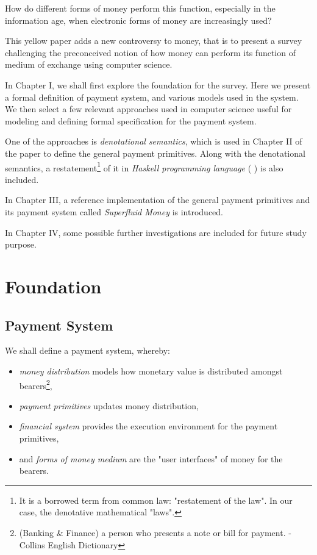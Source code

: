 \documentclass[a4paper]{report}
\begin{document}
How do different forms of money perform this function, especially in the information age, when electronic forms of money
are increasingly used?

This yellow paper adds a new controversy to money, that is to present a survey challenging the preconceived notion of
how money can perform its function of medium of exchange using computer science.

In Chapter I, we shall first explore the foundation for the survey. Here we present a formal definition of payment system,
and various models used in the system. We then select a few relevant approaches used in computer science useful for
modeling and defining formal specification for the payment system.

One of the approaches is \textit{denotational semantics}, which is used in Chapter II of the paper to define the general
payment primitives. Along with the denotational semantics, a restatement\footnote{It is a borrowed term from common law:
"restatement of the law". In our case, the denotative mathematical "laws".} of it in \textit{Haskell programming
    language} (\cite{hudak1992report} \cite{jones2003haskell} \cite{marlow2010haskell}) is also included.

In Chapter III, a reference implementation of the general payment primitives and its payment system called
\textit{Superfluid Money} is introduced.

In Chapter IV, some possible further investigations are included for future study purpose.

\chapter{Foundation}

\section{Payment System}

We shall define a payment system, whereby:

\begin{itemize}
\item \textit{money distribution} models how monetary value is distributed amongst bearers\footnote{(Banking \& Finance)
a person who presents a note or bill for payment. - Collins English Dictionary},
\item \textit{payment primitives} updates money distribution,
\item \textit{financial system} provides the execution environment for the payment primitives,
\item and \textit{forms of money medium} are the "user interfaces" of money for the bearers.
\end{itemize}
\end{document}
